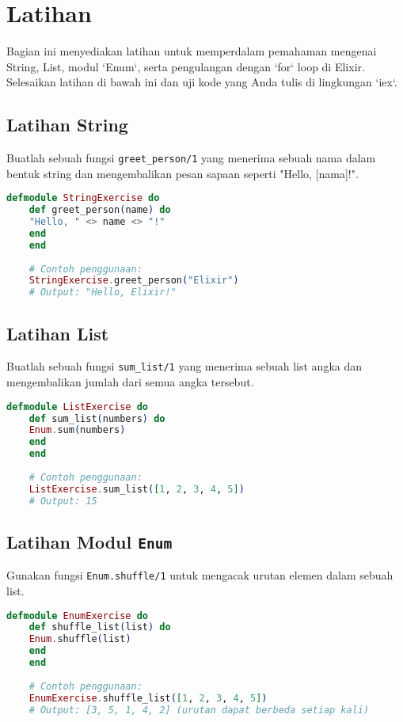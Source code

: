 \section{Latihan}

Bagian ini menyediakan latihan untuk memperdalam pemahaman mengenai String, List, modul `Enum`, serta pengulangan dengan `for` loop di Elixir. Selesaikan latihan di bawah ini dan uji kode yang Anda tulis di lingkungan `iex`.

\subsection{Latihan String}

Buatlah sebuah fungsi \texttt{greet\_person/1} yang menerima sebuah nama dalam bentuk string dan mengembalikan pesan sapaan seperti "Hello, [nama]!".

\begin{lstlisting}[language=Elixir]
	defmodule StringExercise do
	def greet_person(name) do
	"Hello, " <> name <> "!"
	end
	end
	
	# Contoh penggunaan:
	StringExercise.greet_person("Elixir")
	# Output: "Hello, Elixir!"
\end{lstlisting}

\subsection{Latihan List}

Buatlah sebuah fungsi \texttt{sum\_list/1} yang menerima sebuah list angka dan mengembalikan jumlah dari semua angka tersebut.

\begin{lstlisting}[language=Elixir]
	defmodule ListExercise do
	def sum_list(numbers) do
	Enum.sum(numbers)
	end
	end
	
	# Contoh penggunaan:
	ListExercise.sum_list([1, 2, 3, 4, 5])
	# Output: 15
\end{lstlisting}

\subsection{Latihan Modul \texttt{Enum}}

Gunakan fungsi \texttt{Enum.shuffle/1} untuk mengacak urutan elemen dalam sebuah list.

\begin{lstlisting}[language=Elixir]
	defmodule EnumExercise do
	def shuffle_list(list) do
	Enum.shuffle(list)
	end
	end
	
	# Contoh penggunaan:
	EnumExercise.shuffle_list([1, 2, 3, 4, 5])
	# Output: [3, 5, 1, 4, 2] (urutan dapat berbeda setiap kali)
\end{lstlisting}

